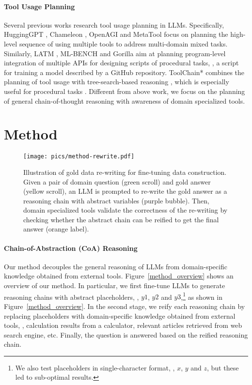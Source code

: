 \paragraph{Tool Usage Planning}
Several previous works research tool usage planning in LLMs.
Specifically, HuggingGPT \citep{shen2023hugginggpt}, Chameleon \citep{lu2023chameleon}, OpenAGI \citep{ge2023openagi} and MetaTool \citep{huang2023metatool} focus on planning the high-level sequence of using multiple tools to address multi-domain mixed tasks.
Similarly, LATM \citep{cai2023large}, ML-BENCH \citep{liu2023ml} and Gorilla \citep{patil2023gorilla} aim at planning program-level integration of multiple APIs for designing scripts of procedural tasks, \eg{}, a script for training a model described by a GitHub repository.
ToolChain* \citep{zhuang2023toolchain} combines the planning of tool usage with tree-search-based reasoning \citep{yao2023tree,hao2023reasoning}, which is especially useful for procedural tasks \citep{xu2023tool,cobbe2021training}.
Different from above work, we focus on the planning of general chain-of-thought \citep{wei2022chain} reasoning with awareness of domain specialized tools.

\section{Method}

\begin{figure}[t]
\centering
\texttt{[image: pics/method-rewrite.pdf]}
\caption{Illustration of gold data re-writing for fine-tuning data construction. Given a pair of domain question (green scroll) and gold answer (yellow scroll), an LLM is prompted to re-write the gold answer as a reasoning chain with abstract variables (purple bubble). Then, domain specialized tools validate the correctness of the re-writing by checking whether the abstract chain can be reified to get the final answer (orange label).
}
\label{method_rewrite}
\end{figure}

\paragraph{Chain-of-Abstraction (CoA) Reasoning}

Our method decouples the general reasoning of LLMs from domain-specific knowledge obtained from external tools.
Figure~\ref{method_overview} shows an overview of our method.
In particular, we first fine-tune LLMs to generate reasoning chains with abstract placeholders, \eg{}, $y1$, $y2$ and $y3$,\footnote{We also test placeholders in single-character format, \eg{}, $x$, $y$ and $z$, but these led to sub-optimal results.} as shown in Figure~\ref{method_overview}.
In the second stage, we reify each reasoning chain by replacing placeholders with domain-specific knowledge obtained from external tools, \eg{}, calculation results from a calculator, relevant articles retrieved from web search engine, etc.
Finally, the question is answered based on the reified reasoning chain.

